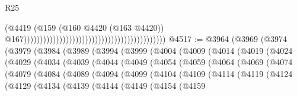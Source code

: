 \begin{lexlean}{R25}
\begin{coremodule}
                                                                                        (@4419
                                                                                          (@159
                                                                                            (@160
                                                                                              @4420
                                                                                              (@163
                                                                                                @4420))
                                                                                            @167))))))))))))))))))))))))))))))))))))))))))))
@4517 := @3964
    (@3969
      (@3974
        (@3979
          (@3984
            (@3989
              (@3994
                (@3999
                  (@4004
                    (@4009
                      (@4014
                        (@4019
                          (@4024
                            (@4029
                              (@4034
                                (@4039
                                  (@4044
                                    (@4049
                                      (@4054
                                        (@4059
                                          (@4064
                                            (@4069
                                              (@4074
                                                (@4079
                                                  (@4084
                                                    (@4089
                                                      (@4094
                                                        (@4099
                                                          (@4104
                                                            (@4109
                                                              (@4114
                                                                (@4119
                                                                  (@4124
                                                                    (@4129
                                                                      (@4134
                                                                        (@4139
                                                                          (@4144
                                                                            (@4149
                                                                              (@4154
                                                                                (@4159

\end{coremodule}
\end{lexlean}
